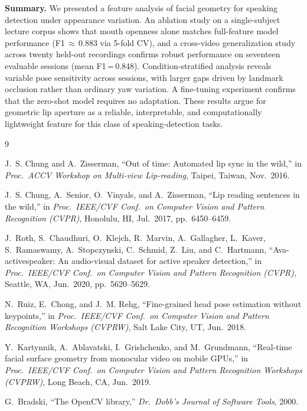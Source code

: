 \documentclass[conference]{IEEEtran}
\begin{document}
\textbf{Summary.}
We presented a feature analysis of facial geometry for speaking detection
under appearance variation.
An ablation study on a single-subject lecture corpus shows that mouth openness
alone matches full-feature model performance (F1\,$\approx$\,0.883 via 5-fold CV),
and a cross-video generalization study across twenty held-out recordings confirms
robust performance on seventeen evaluable sessions (mean F1\,=\,0.848).
Condition-stratified analysis reveals variable pose sensitivity across sessions,
with larger gaps driven by landmark occlusion rather than ordinary yaw variation.
A fine-tuning experiment confirms that the zero-shot model requires no adaptation.
These results argue for geometric lip aperture as a reliable, interpretable,
and computationally lightweight feature for this class of speaking-detection tasks.



\begin{thebibliography}{9}

J.~S. Chung and A.~Zisserman,
``Out of time: Automated lip sync in the wild,''
in \textit{Proc.\ ACCV Workshop on Multi-view Lip-reading},
Taipei, Taiwan, Nov.\ 2016.

J.~S. Chung, A.~Senior, O.~Vinyals, and A.~Zisserman,
``Lip reading sentences in the wild,''
in \textit{Proc.\ IEEE/CVF Conf.\ on Computer Vision and Pattern Recognition (CVPR)},
Honolulu, HI, Jul.\ 2017, pp.\ 6450--6459.

J.~Roth, S.~Chaudhuri, O.~Klejch, R.~Marvin, A.~Gallagher, L.~Kaver,
S.~Ramaswamy, A.~Stopczynski, C.~Schmid, Z.~Liu, and C.~Hartmann,
``Ava-activespeaker: An audio-visual dataset for active speaker detection,''
in \textit{Proc.\ IEEE/CVF Conf.\ on Computer Vision and Pattern Recognition (CVPR)},
Seattle, WA, Jun.\ 2020, pp.\ 5620--5629.

N.~Ruiz, E.~Chong, and J.~M. Rehg,
``Fine-grained head pose estimation without keypoints,''
in \textit{Proc.\ IEEE/CVF Conf.\ on Computer Vision and Pattern Recognition Workshops (CVPRW)},
Salt Lake City, UT, Jun.\ 2018.

Y.~Kartynnik, A.~Ablavatski, I.~Grishchenko, and M.~Grundmann,
``Real-time facial surface geometry from monocular video on mobile {GPU}s,''
in \textit{Proc.\ IEEE/CVF Conf.\ on Computer Vision and Pattern Recognition Workshops (CVPRW)},
Long Beach, CA, Jun.\ 2019.

G.~Bradski,
``The {OpenCV} library,''
\textit{Dr.\ Dobb's Journal of Software Tools}, 2000.

\end{thebibliography}
\end{document}

